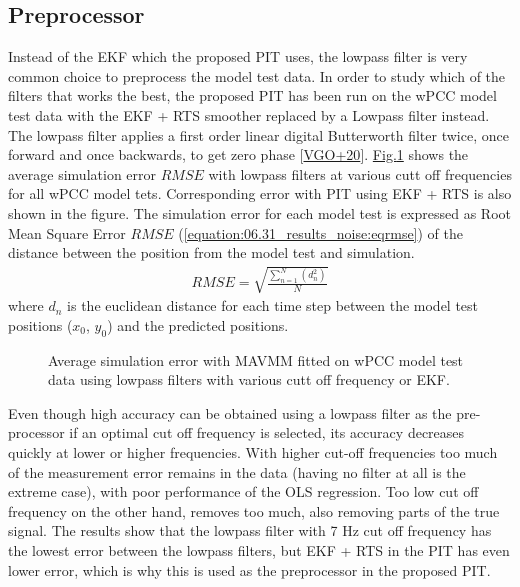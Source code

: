 \documentclass[review]{elsarticle}
\begin{document}
\subsection{Preprocessor}
\label{\detokenize{06.31_results_noise:preprocessor}}\label{\detokenize{06.31_results_noise::doc}}
\sphinxAtStartPar
Instead of the EKF which the proposed PIT uses, the low\sphinxhyphen{}pass filter is very common choice to preprocess the model test data.
In order to study which of the filters that works the best, the proposed PIT has been run on the wPCC model test data with the EKF + RTS smoother replaced by a Low\sphinxhyphen{}pass filter instead. The low\sphinxhyphen{}pass filter applies a first order linear digital Butterworth filter twice, once forward and once backwards, to get zero phase {[}\hyperlink{cite.bibligraphy:id83}{VGO+20}{]}. \hyperref[\detokenize{06.31_results_noise:fig-lowpass-accuracy}]{Fig.\@ \ref{\detokenize{06.31_results_noise:fig-lowpass-accuracy}}} shows the average simulation error \( {RMSE} \) with low\sphinxhyphen{}pass filters at various cutt off frequencies for all wPCC model tets. Corresponding error with PIT using EKF + RTS is also shown in the figure. The simulation error for each model test is expressed as Root Mean Square Error \(RMSE\) (\autoref{equation:06.31_results_noise:eqrmse}) of the distance between the position from the model test and simulation.
\begin{equation}\label{equation:06.31_results_noise:eqrmse}
\begin{split}RMSE=\sqrt{ \frac{\sum_{n=1}^{N} (d_n^2) }{N}} \end{split}
\end{equation}
\sphinxAtStartPar
where \(d_n\) is the euclidean distance for each time step between the model test positions (\(x_0\), \(y_0\)) and the predicted positions.

\begin{figure}[H]
\centering
\capstart

\noindent{}
\caption{Average simulation error with MAVMM fitted on wPCC model test data using low\sphinxhyphen{}pass filters with various cutt off frequency or EKF.}\label{\detokenize{06.31_results_noise:fig-lowpass-accuracy}}\end{figure}

\sphinxAtStartPar
Even though high accuracy can be obtained using a low\sphinxhyphen{}pass filter as the pre-processor if an optimal cut off frequency is selected, its accuracy decreases quickly at lower or higher frequencies. With higher cut-off frequencies too much of the measurement error remains in the data (having no filter at all is the extreme case), with poor performance of the OLS regression. Too low cut off frequency on the other hand, removes too much, also removing parts of the true signal. The results show that the low\sphinxhyphen{}pass filter with 7 Hz cut off frequency has the lowest error between the low\sphinxhyphen{}pass filters, but EKF + RTS in the PIT has even lower error, which is why this is used as the preprocessor in the proposed PIT.
\end{document}
